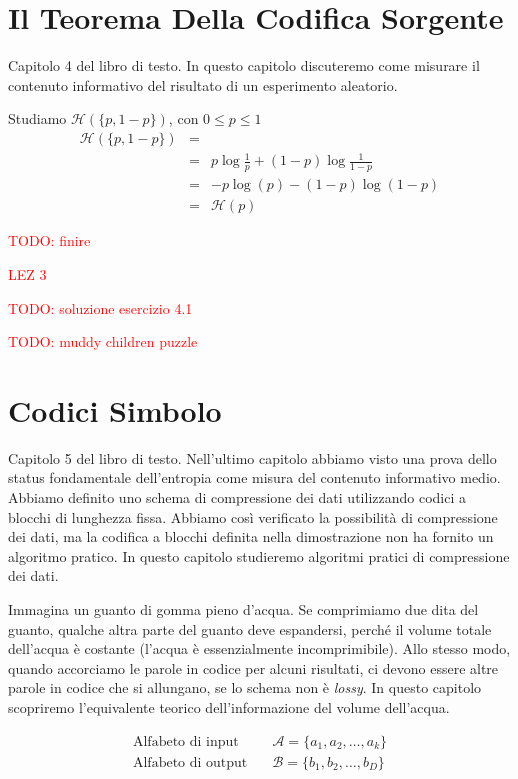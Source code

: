 \section{Il Teorema Della Codifica Sorgente}
Capitolo 4 del libro di testo. In questo capitolo discuteremo come misurare il contenuto informativo del risultato di un esperimento aleatorio.\bigskip

\noindent Studiamo $\mathcal{H}(\{p,1-p\})$, con $0\leq p\leq 1$
\begin{eqnarray*}
    \mathcal{H}(\{p,1-p\})  & = &\\
                            & = & p\log\frac{1}{p} + (1-p)\log\frac{1}{1-p}\\
                            & = & -p\log(p) - (1-p)\log(1-p)\\
                            & = & \mathcal{H}(p)
\end{eqnarray*}

\textcolor{Red}{TODO: finire}


\textcolor{Red}{LEZ 3}

\textcolor{Red}{TODO: soluzione esercizio 4.1}

\textcolor{Red}{TODO: muddy children puzzle}



\section{Codici Simbolo}
Capitolo 5 del libro di testo. Nell'ultimo capitolo abbiamo visto una prova dello status fondamentale dell'entropia come misura del contenuto informativo medio. Abbiamo definito uno schema di compressione dei dati utilizzando codici a blocchi di lunghezza fissa. Abbiamo così verificato la possibilità di compressione dei dati, ma la codifica a blocchi definita nella dimostrazione non ha fornito un algoritmo pratico. In questo capitolo studieremo algoritmi pratici di compressione dei dati.

Immagina un guanto di gomma pieno d'acqua. Se comprimiamo due dita del guanto, qualche altra parte del guanto deve espandersi, perché il volume totale dell'acqua è costante (l'acqua è essenzialmente incomprimibile). Allo stesso modo, quando accorciamo le parole in codice per alcuni risultati, ci devono essere altre parole in codice che si allungano, se lo schema non è \emph{lossy}. In questo capitolo scopriremo l'equivalente teorico dell'informazione del volume dell'acqua.

\begin{definition}
    \begin{align*}
        \text{Alfabeto di input} \quad &\mathcal{A}=\{a_1,a_2,\dots,a_k\}\\
        \text{Alfabeto di output} \quad &\mathcal{B}=\{b_1,b_2,\dots,b_D\}\\
    \end{align*}
\end{definition}

